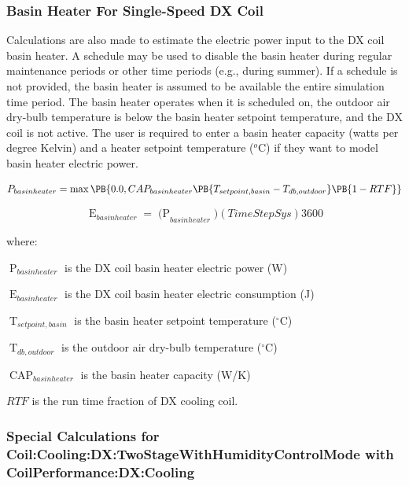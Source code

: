 \subsubsection{Basin Heater For Single-Speed DX Coil}\label{basin-heater-for-single-speed-dx-coil}

Calculations are also made to estimate the electric power input to the DX coil basin heater. A schedule may be used to disable the basin heater during regular maintenance periods or other time periods (e.g., during summer). If a schedule is not provided, the basin heater is assumed to be available the entire simulation time period. The basin heater operates when it is scheduled on, the outdoor air dry-bulb temperature is below the basin heater setpoint temperature, and the DX coil is not active. The user is required to enter a basin heater capacity (watts per degree Kelvin) and a heater setpoint temperature (\(^{o}\)C) if they want to model basin heater electric power.

\begin{equation}
 P_{basinheater} = \max\PB{0.0, CAP_{basinheater} \PB{T_{setpoint,basin} - T_{db,outdoor} }\PB{1 - RTF}}
\end{equation}

\begin{equation}
  \mathop E\nolimits_{basinheater} = \mathop {(P}\nolimits_{basinheater} )(TimeStepSys)3600
\end{equation}

where:

\(\mathop P\nolimits_{basinheater}\) is the DX coil basin heater electric power (W)

\(\mathop E\nolimits_{basinheater}\) is the DX coil basin heater electric consumption (J)

\(\mathop T\nolimits_{setpoint,basin}\) is the basin heater setpoint temperature (\(^{\circ}\)C)

\(\mathop T\nolimits_{db,outdoor}\) is the outdoor air dry-bulb temperature (\(^{\circ}\)C)

\(\mathop {CAP}\nolimits_{basinheater}\) is the basin heater capacity (W/K)

\(RTF\) is the run time fraction of DX cooling coil.

\subsubsection{Special Calculations for Coil:Cooling:DX:TwoStageWithHumidityControlMode with CoilPerformance:DX:Cooling}\label{special-calculations-for-coilcoolingdxtwostagewithhumiditycontrolmode-with-coilperformancedxcooling}

